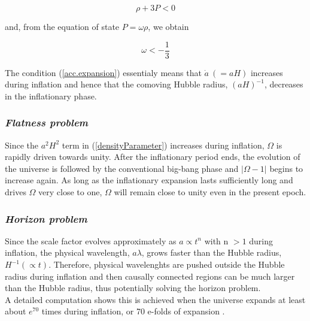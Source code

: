 \documentclass[11pt,a4paper,twoside]{book}
\begin{document}
\begin{equation}
	\label{equationOfState}
	\rho + 3P < 0
\end{equation}

and, from  the equation of state $ P = \omega \rho  $, we obtain 

\begin{equation}
	\label{w parameter}
	\omega < -\frac{1}{3}
\end{equation}

The condition (\ref{acc.expansion}) essentialy means that $ \dot{a}\ (= aH) $ increases during inflation and hence that the comoving Hubble radius, $ (aH)^{-1} $, decreases in the inflationary phase.

\subsubsection*{\textit{Flatness problem}}
Since the $ a^{2}H^{2} $ term in (\ref{densityParameter}) increases during inflation, $ \Omega $ is rapidly driven towards unity. After the inflationary period ends, the evolution of the universe is followed by the conventional big-bang phase and $|\Omega-1| $ begins to increase again. As long as the inflationary expansion lasts sufficiently long and drives $ \Omega $ very close to one, $ \Omega $  will remain close to unity even in the present epoch.  

\subsubsection*{\textit{Horizon problem}}
Since the scale factor evolves approximately as $ a \propto t^{n} $ with n $ > 1 $ during inflation, the physical wavelength, $a \lambda $, grows faster than the Hubble radius, $ H^{-1}(\propto t)$. Therefore, physical wavelenghts are pushed outside the Hubble radius during inflation and then causally connected regions can be much larger than the Hubble radius, thus potentially solving the horizon problem.\\
A detailed computation shows this is achieved when the universe expands at least about $ e^{70} $ times during inflation, or 70 e-folds of expansion \cite{Liddle:intro}.
\end{document}
